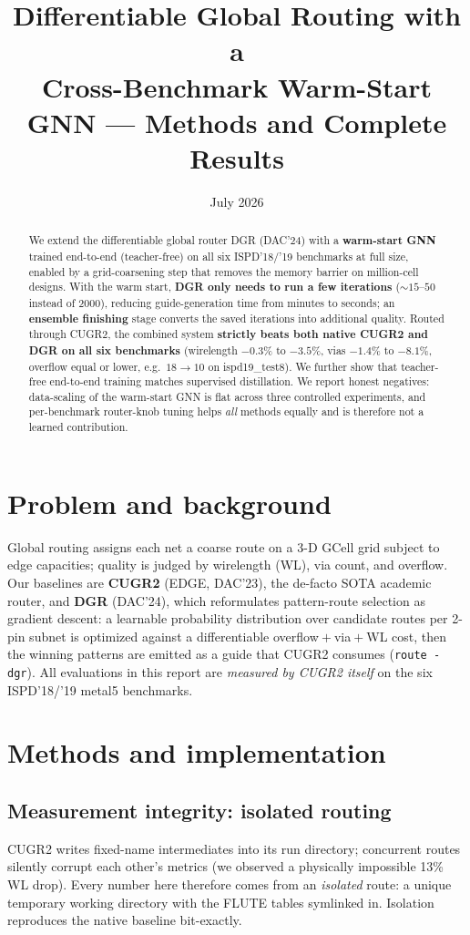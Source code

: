 \documentclass[11pt]{article}
\title{Differentiable Global Routing with a\\
Cross-Benchmark Warm-Start GNN --- Methods and Complete Results}
\date{July 2026}
\begin{document}
\maketitle

\begin{abstract}
We extend the differentiable global router DGR (DAC'24) with a
\textbf{warm-start GNN} trained end-to-end (teacher-free) on all six
ISPD'18/'19 benchmarks at full size, enabled by a grid-coarsening step that
removes the memory barrier on million-cell designs. With the warm start,
\textbf{DGR only needs to run a few iterations} (${\sim}15$--$50$ instead of
2000), reducing guide-generation time from minutes to seconds; an
\textbf{ensemble finishing} stage converts the saved iterations into
additional quality. Routed through CUGR2, the combined system
\textbf{strictly beats both native CUGR2 and DGR on all six benchmarks}
(wirelength $-0.3$\% to $-3.5$\%, vias $-1.4$\% to $-8.1$\%, overflow equal
or lower, e.g.\ $18\!\to\!10$ on ispd19\_test8). We further show that
teacher-free end-to-end training matches supervised distillation. We report
honest negatives: data-scaling of the warm-start GNN is flat across three controlled
experiments, and per-benchmark router-knob tuning helps \emph{all} methods
equally and is therefore not a learned contribution.
\end{abstract}

\section{Problem and background}
Global routing assigns each net a coarse route on a 3-D GCell grid subject to
edge capacities; quality is judged by wirelength (WL), via count, and
overflow. Our baselines are \textbf{CUGR2} (EDGE, DAC'23), the de-facto SOTA
academic router, and \textbf{DGR} (DAC'24), which reformulates pattern-route
selection as gradient descent: a learnable probability distribution over
candidate routes per 2-pin subnet is optimized against a differentiable
overflow${}+{}$via${}+{}$WL cost, then the winning patterns are emitted as a
guide that CUGR2 consumes (\texttt{route -dgr}). All evaluations in this
report are \emph{measured by CUGR2 itself} on the six ISPD'18/'19 metal5
benchmarks.

\section{Methods and implementation}
\subsection{Measurement integrity: isolated routing}
CUGR2 writes fixed-name intermediates into its run directory; concurrent
routes silently corrupt each other's metrics (we observed a physically
impossible 13\% WL drop). Every number here therefore comes from an
\emph{isolated} route: a unique temporary working directory with the FLUTE
tables symlinked in. Isolation reproduces the native baseline bit-exactly.
\end{document}
